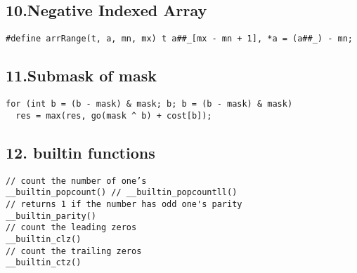 \documentclass[twoside]{article}
\begin{document}
\begin{multicols*}{2}
\begin{verbatim}
\end{verbatim}

{
\subsection*{10.Negative Indexed Array}
}
\begin{verbatim}
#define arrRange(t, a, mn, mx) t a##_[mx - mn + 1], *a = (a##_) - mn;
\end{verbatim}

{
\subsection*{11.Submask of mask}
}
\begin{verbatim}
for (int b = (b - mask) & mask; b; b = (b - mask) & mask)
  res = max(res, go(mask ^ b) + cost[b]);
\end{verbatim}

{
\subsection*{12.  builtin functions}
}
\begin{verbatim}
// count the number of one’s
__builtin_popcount() // __builtin_popcountll()
// returns 1 if the number has odd one's parity
__builtin_parity()
// count the leading zeros
__builtin_clz()
// count the trailing zeros
__builtin_ctz()
\end{verbatim}

{
}
\end{multicols*}
\end{document}
